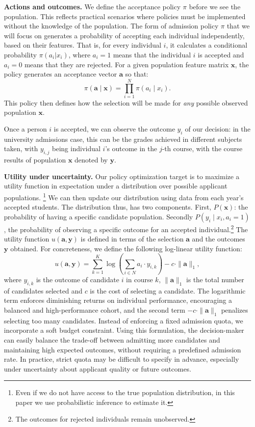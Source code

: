 \documentclass[acmlarge]{acmart-ecaf}
\newcommand {\pop} {N}
\newcommand {\feat} {x}
\newcommand {\Pfeat} {\mathbf{x}}
\newcommand {\pol} {\pi}
\newcommand {\Pact} {\mathbf{a}}
\newcommand {\act} {a}
\newcommand {\Pout} {\mathbf{y}}
\newcommand {\out} {y}
\begin{document}
\textbf{Actions and outcomes.} We define the acceptance policy $\pol$ before we see the population. This reflects practical scenarios where policies must be implemented without the knowledge of the population. The form of admission policy $\pol$ that we will focus on generates a probability of accepting each individual independently, based on their features. That is, for every individual $i$, it calculates a conditional probability $\pol(a_i |  x_i)$, where $a_i = 1$ means that the individual $i$ is accepted and $a_i = 0$ means that they are rejected. For a given population feature matrix $\Pfeat$, the policy generates an acceptance vector $\Pact$ so that:
\[
\pol(\Pact \mid \Pfeat) = \prod_{i=1}^\pop \pol(\act_i \mid \feat_i).
\]
This policy then defines how the selection will be made for \emph{any} possible observed population $\Pfeat$.

Once a person $i$ is accepted, we can observe the outcome $\out_i$ of our decision: in the university admissions case, this can be the grades achieved in different subjects taken, with $\out_{i,j}$ being individual $i$'s outcome in the $j$-th course, with the course results of  population $\Pfeat$ denoted by $\Pout$.

\textbf{Utility under uncertainty.} Our policy optimization target is to maximize a utility function in expectation under a distribution over possible applicant populations.
\footnote{Even if we do not have access to the true population distribution, in this paper we use probabilistic inference to estimate it.}  We can then update our distribution using data from each year's accepted students. The distribution thus, has two components. First, $P(\Pfeat)$: the probability of having a specific candidate population. Secondly $P(\out_i \mid x_i, a_i = 1)$, the probability of observing a specific outcome for an accepted individual.\footnote{The outcomes for rejected individuals remain unobserved.} The utility function $u(\Pact, \Pout)$ is defined in terms of the selection \(\Pact\) and the outcomes \(\Pout\) obtained. 
For concreteness, we define the following log-linear utility function:
\begin{equation}
\label{eq:U_ay}
u(\Pact, \Pout) = \sum_{k=1}^K \log\left(\sum_{i \in N} a_i \cdot y_{i,k}\right) - c \cdot \|\Pact\|_1,
\end{equation}
where $y_{i,k} $ is the outcome of candidate $ i $ in course $ k $, $ \|\Pact\|_1 $ is the total number of candidates selected and $ c $ is the cost of selecting a candidate. The logarithmic term enforces diminishing returns on individual performance, encouraging a balanced and high-performance cohort, and the second term $- c \cdot \|\Pact\|_1$
 penalizes selecting too many candidates. Instead of enforcing a fixed admission quota, we incorporate a soft budget constraint. Using this formulation, the decision-maker can easily  balance the trade-off between admitting more candidates and maintaining high expected outcomes, without requiring a predefined admission rate. In practice, strict quota may be difficult to specify in advance, especially under uncertainty about applicant quality or future outcomes. 
\end{document}
